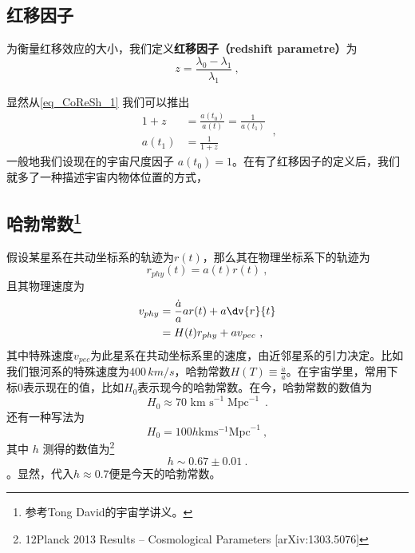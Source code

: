 \subsection{红移因子}
\begin{definition}{}
为衡量红移效应的大小，我们定义\textbf{红移因子（redshift parametre）}为
\begin{equation}
z=\frac{\lambda_0-\lambda_1}{\lambda_1}~,
\end{equation}
\end{definition}
显然从\autoref{eq_CoReSh_1} 我们可以推出
\begin{equation}
\begin{aligned}
1+z&=\frac{a(t_0)}{a(t)}=\frac{1}{a(t_1)}\\
a(t_1)&=\frac{1}{1+z}
\end{aligned}~,
\end{equation}
一般地我们设现在的宇宙尺度因子 $a(t_0)=1$。在有了红移因子的定义后，我们就多了一种描述宇宙内物体位置的方式，

\subsection{哈勃常数\footnote{参考Tong David的宇宙学讲义。}}

假设某星系在共动坐标系的轨迹为$r(t)$，那么其在物理坐标系下的轨迹为
\begin{equation}
r_{phy}(t)=a(t)r(t)~,
\end{equation}
且其物理速度为
\begin{equation}
\begin{aligned}
v_{phy}& =\frac{\dot a}{a}ar(t)+a\dv{r}{t}\\
&=H(t)r_{phy}+av_{pec}~,
\end{aligned}
\end{equation}
其中特殊速度$v_{pec}$为此星系在共动坐标系里的速度，由近邻星系的引力决定。比如我们银河系的特殊速度为$400\,km/s$，哈勃常数$H(T)\equiv \frac{\dot a}{a}$。在宇宙学里，常用下标0表示现在的值，比如$H_0$表示现今的哈勃常数。在今，哈勃常数的数值为
\begin{equation}H_0\approx70\text{ km s}^{-1}\operatorname{Mpc}^{-1}~.
\end{equation}
还有一种写法为
\begin{equation}H_0=100h \mathrm{km} \mathrm{s}^{-1} \mathrm{Mpc}^{-1}~,\end{equation}
其中 $h$ 测得的数值为\footnote{12Planck 2013 Results – Cosmological Parameters [arXiv:1303.5076]}
\begin{equation}
h\sim 0.67 \pm 0.01~.
\end{equation}。显然，代入$h\approx 0.7$便是今天的哈勃常数。

